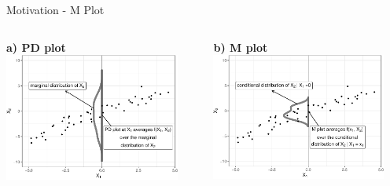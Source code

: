 \documentclass[11pt,compress,t,notes=noshow, aspectratio=169, xcolor=table]{beamer}
\begin{document}
\begin{frame}{Motivation - M Plot}


\begin{columns}[T]
\begin{column}{0.5\textwidth}
\vspace*{-1em}
\centering
\textbf{a) PD plot}
\includegraphics[width=0.9\textwidth]{figure/ale_pdplot}
\end{column}
\begin{column}{0.5\textwidth}
\vspace*{-1em}
\textbf{b) M plot}
\centering
\includegraphics[width=0.9\textwidth]{figure/ale_mplot}
\end{column}
\end{columns}


\end{frame}
\end{document}

